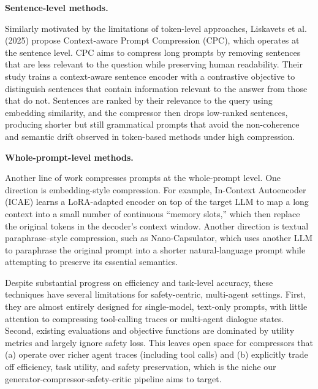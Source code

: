 \documentclass[11pt]{article}
\begin{document}
\noindent\textbf{Sentence-level methods.} 

Similarly motivated by the limitations of token-level approaches, Liskavets et al. (2025) propose Context-aware Prompt Compression (CPC), which operates at the sentence level. CPC aims to compress long prompts by removing sentences that are less relevant to the question while preserving human readability. Their study trains a context-aware sentence encoder with a contrastive objective to distinguish sentences that contain information relevant to the answer from those that do not. Sentences are ranked by their relevance to the query using embedding similarity, and the compressor then drops low-ranked sentences, producing shorter but still grammatical prompts that avoid the non-coherence and semantic drift observed in token-based methods under high compression. \newline

\noindent\textbf{Whole-prompt-level methods.} 

Another line of work compresses prompts at the whole-prompt level. One direction is embedding-style compression. For example, In-Context Autoencoder (ICAE) learns a LoRA-adapted encoder on top of the target LLM to map a long context into a small number of continuous “memory slots,” which then replace the original tokens in the decoder’s context window. Another direction is textual paraphrase–style compression, such as Nano-Capsulator, which uses another LLM to paraphrase the original prompt into a shorter natural-language prompt while attempting to preserve its essential semantics.


Despite substantial progress on efficiency and task-level accuracy, these techniques have several limitations for safety-centric, multi-agent settings. First, they are almost entirely designed for single-model, text-only prompts, with little attention to compressing tool-calling traces or multi-agent dialogue states. Second, existing evaluations and objective functions are dominated by utility metrics and largely ignore safety loss. This leaves open space for compressors that (a) operate over richer agent traces (including tool calls) and (b) explicitly trade off efficiency, task utility, and safety preservation, which is the niche our generator-compressor-safety-critic pipeline aims to target.




 
\nocite{*}
\end{document}

